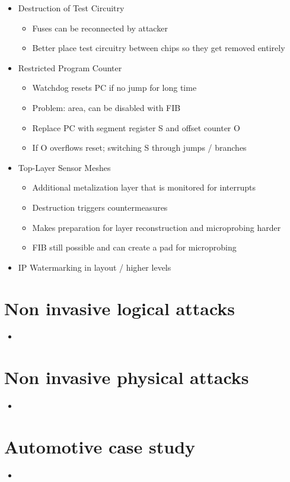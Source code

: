 \documentclass[11pt, paper=a4, twocolumn]{scrartcl}
\begin{document}
\begin{itemize}
\begin{itemize}
\begin{itemize}
						\end{itemize}
					\item Destruction of Test Circuitry
						\begin{itemize}
							\item Fuses can be reconnected by attacker
							\item Better place test circuitry between chips so they get removed entirely
						\end{itemize}
					\item Restricted Program Counter
						\begin{itemize}
							\item Watchdog resets PC if no jump for long time
							\item Problem: area, can be disabled with FIB
							\item Replace PC with segment register S and offset counter O
							\item If O overflows reset; switching S through jumps / branches
						\end{itemize}
					\item Top-Layer Sensor Meshes
						\begin{itemize}
							\item Additional metalization layer that is monitored for interrupts
							\item Destruction triggers countermeasures
							\item Makes preparation for layer reconstruction and microprobing harder
							\item FIB still possible and can create a pad for microprobing
						\end{itemize}
					\item IP Watermarking in layout / higher levels
				\end{itemize}

		\end{itemize}

	\section{Non invasive logical attacks}
		\begin{itemize}
			\item 
		\end{itemize}

	\section{Non invasive physical attacks}
		\begin{itemize}
			\item 
		\end{itemize}

	\section{Automotive case study}
		\begin{itemize}
			\item 
		\end{itemize}
\end{document}
